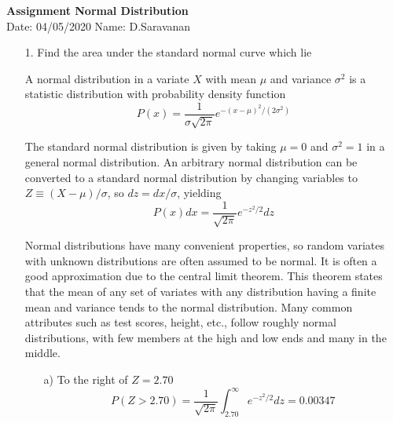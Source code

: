 \documentclass[a4paper,10pt,openright]{report}
\begin{document}
\singlespacing
\pagestyle{plain}

\begin{center}
\textbf{Assignment Normal Distribution} \\
Date: 04/05/2020 \hspace{2mm} Name: D.Saravanan
\end{center}

\vspace{10px}

\begin{enumerate}

\item[1.] Find the area under the standard normal curve which lie 

A normal distribution in a variate $X$ with mean $\mu$ and variance $\sigma^{2}$ is
a statistic distribution with probability density function 
\begin{equation*}
P(x) = \frac{1}{\sigma \sqrt{2\pi}} e^{-(x-\mu)^{2}/(2\sigma^{2})} 
\end{equation*}

The standard normal distribution is given by taking $\mu = 0$ and $\sigma^{2} = 1$ in 
a general normal distribution. An arbitrary normal distribution can be converted to a
standard normal distribution by changing variables to $Z \equiv (X-\mu)/\sigma$, so
$dz = dx/\sigma$, yielding
\begin{equation*}
P(x) dx = \frac{1}{\sqrt{2\pi}} e^{-z^{2}/2} dz
\end{equation*}

Normal distributions have many convenient properties, so random variates with unknown
distributions are often assumed to be normal. It is often a good approximation due to the
central limit theorem. This theorem states that the mean of any set of variates with any 
distribution having a finite mean and variance tends to the normal distribution. Many common
attributes such as test scores, height, etc., follow roughly normal distributions, with few
members at the high and low ends and many in the middle.

\pagebreak

\begin{enumerate}

\item[a)] To the right of $Z = 2.70$
\begin{equation*}
P(Z > 2.70) = \frac{1}{\sqrt{2\pi}} \int_{2.70}^{\infty} e^{-z^{2}/2} dz = 0.00347
\end{equation*}


\end{enumerate}
\end{enumerate}
\end{document}
